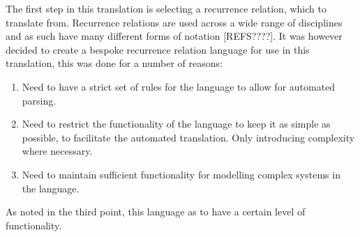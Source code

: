 \documentclass{article}
\begin{document}







The first step in this translation is selecting a recurrence relation, which to translate from. Recurrence relations are used across a wide range of disciplines and as such have many different forms of notation {\color{red} [REFS????]}. It was however decided to create a bespoke recurrence relation language for use in this translation, this was done for a number of reasons:
\begin{enumerate}
  \item Need to have a strict set of rules for the language to allow for automated parsing. 
  \item Need to restrict the functionality of the language to keep it as simple as possible, to facilitate the automated translation. Only introducing complexity where necessary.  
  \item Need to maintain sufficient functionality for modelling complex systems in the language.  
\end{enumerate} 

As noted in the third point, this language as to have a certain level of functionality. 
\end{document}
